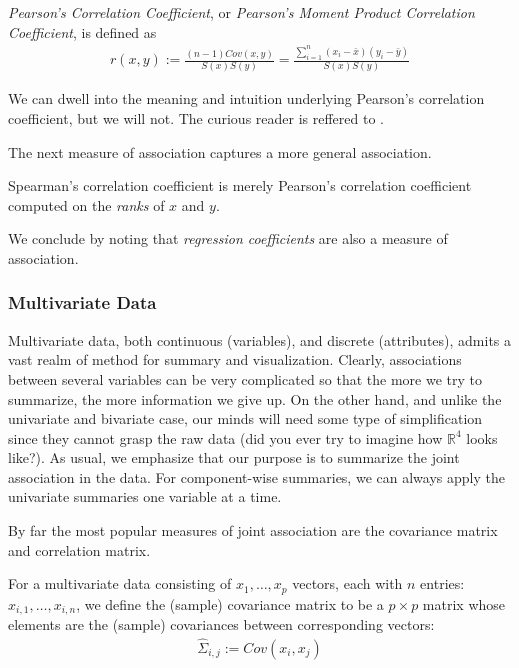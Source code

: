 \begin{definition}
\emph{Pearson’s Correlation Coefficient}, or \emph{Pearson's Moment Product Correlation Coefficient}, is defined as
\begin{align}
	r(x,y):= \frac{(n-1) Cov(x,y)}{S(x) S(y)}= \frac{\sum_{i=1}^{n} (x_i-\bar{x})(y_i-\bar{y})}{S(x) S(y)}
\end{align}
\end{definition}
We can dwell into the meaning and intuition underlying Pearson's correlation coefficient, but we will not. 
The curious reader is reffered to \cite{rodgers_thirteen_1988}.

The next measure of association captures a more general association.
\begin{definition}
Spearman's correlation coefficient is merely Pearson's correlation coefficient computed on the \emph{ranks} of $x$ and $y$. 
\end{definition}

We conclude by noting that \emph{regression coefficients} are also a measure of association. 





\subsubsection{Multivariate Data}
Multivariate data, both continuous (variables), and discrete (attributes), admits a vast realm of method for summary and visualization.
Clearly, associations between several variables can be very complicated so that the more we try to summarize, the more information we give up. On the other hand, and unlike the univariate and bivariate case, our minds will need some type of simplification since they cannot grasp the raw data (did you ever try to imagine how $\mathbb{R}^4$ looks like?).
As usual, we emphasize that our purpose is to summarize the joint association in the data. 
For component-wise summaries, we can always apply the univariate summaries one variable at a time. 

By far the most popular measures of joint association are the covariance matrix and correlation matrix.

\begin{definition}
For a multivariate data consisting of $x_1,\dots,x_p$ vectors, each with $n$ entries: $x_{i,1},\dots,x_{i,n}$, we define the (sample) covariance matrix to be a $p\times p$ matrix whose elements are the (sample) covariances between corresponding vectors:
\begin{align}
	\hat{\Sigma}_{i,j}:= Cov(x_i, x_j)
\end{align}
\end{definition}


